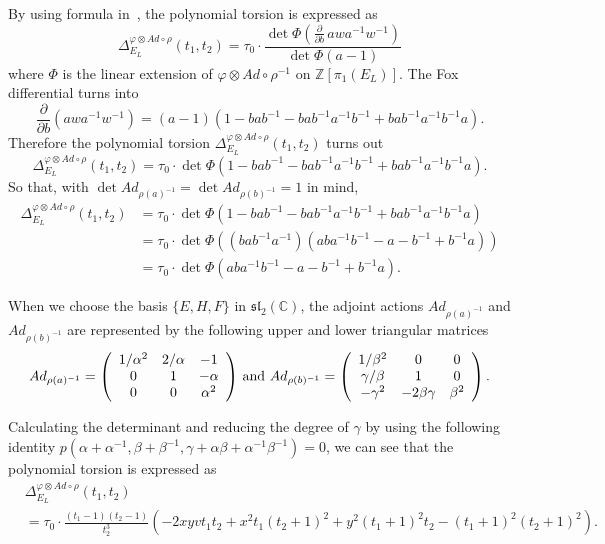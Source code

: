 \documentclass[a4paper]{amsart}
\theoremstyle{plain}
\theoremstyle{definition}
\theoremstyle{remark}
\newcommand{\ZZ}{{\mathbb Z}}
\newcommand{\CC}{{\mathbb C}}
\newcommand{\sll}{\mathfrak{sl}_2(\CC)}
\newcommand{\PolyTors}[2]{\Delta_{#1}^{#2}}
\newcommand{\otAd}[2]{#1 \otimes Ad \circ #2}
\begin{document}
By using formula in~\cite{Milnor:1968,Kitano, KL},
the polynomial torsion is expressed as 
\[
\PolyTors{E_L}{\otAd{\varphi}{\rho}}(t_1, t_2)
= 
\tau_0 \cdot 
\frac{\det \Phi \left( \frac{\partial}{\partial b}\, awa^{-1}w^{-1}  \right)}{\det \Phi(a-1)}
\]
where $\Phi$ is the linear extension of $\otAd{\varphi}{\rho^{-1}}$ on $\ZZ[\pi_1(E_L)]$.
The Fox differential turns into 
\[
\frac{\partial}{\partial b}\left( {awa^{-1}w^{-1} }\right)
= (a-1)(1 - bab^{-1} - bab^{-1}a^{-1}b^{-1} + bab^{-1}a^{-1}b^{-1}a).
\]
Therefore the polynomial torsion $\PolyTors{E_L}{\otAd{\varphi}{\rho}}(t_1, t_2)$
turns out 
$$\PolyTors{E_L}{\otAd{\varphi}{\rho}}(t_1, t_2) 
= \tau_0 \cdot \det \Phi(1 - bab^{-1} - bab^{-1}a^{-1}b^{-1} +
bab^{-1}a^{-1}b^{-1}a).$$ 
So that, with $\det Ad _{\rho (a)^{-1}} =
\det Ad_{\rho(b)^{-1}} = 1$ in mind,
\begin{align*}
  \PolyTors{E_L}{\otAd{\varphi}{\rho}}(t_1, t_2)
  &= \tau_0 \cdot 
     \det \Phi(1 - bab^{-1} - bab^{-1}a^{-1}b^{-1} + bab^{-1}a^{-1}b^{-1}a)\\
  &= \tau_0 \cdot 
     \det \Phi\left( (bab^{-1}a^{-1})(aba^{-1}b^{-1} - a - b^{-1} + b^{-1}a ) \right)\\
  &= \tau_0 \cdot  
     \det \Phi(aba^{-1}b^{-1} - a - b^{-1} + b^{-1}a ).
\end{align*}


When we choose the basis $\{E, H, F\}$ in $\sll$, the adjoint actions
$Ad_{\rho(a)^{-1}}$ and $Ad_{\rho(b)^{-1}}$ are represented by the following 
upper and lower triangular matrices
\[
Ad_{\rho(a)^{-1}}=
\left(
  \begin{array}{ccc}
    1/\alpha^2 & 2/\alpha & -1 \\
    0 & 1 & -\alpha \\
    0 & 0 & \alpha^2
  \end{array}
\right)\, \hbox{and}\,\,
Ad_{\rho(b)^{-1}}=
\left(
  \begin{array}{ccc}
    1/\beta^2 & 0 & 0 \\
    \gamma/\beta & 1 & 0 \\
    -\gamma^2 & -2\beta\gamma & \beta^2
  \end{array}
\right).
\]

Calculating the determinant and reducing the degree of $\gamma$ by
using the following identity $p(\alpha + \alpha^{-1}, \beta + \beta^{-1}, \gamma + \alpha
\beta + \alpha^{-1}\beta^{-1})=0$, we can see that the polynomial
torsion is expressed as
\begin{align}\label{eqn:PolyTorsion_WL}
  &\PolyTors{E_L}{\otAd{\varphi}{\rho}}(t_1, t_2)\\
  &= \tau_0 \cdot 
    \frac{(t_1-1)(t_2-1)}{t_2^3} 
    \left( -2xyv t_1t_2 +
    x^2 t_1(t_2+1)^2 + y^2 (t_1+1)^2 t_2 - (t_1+1)^2 (t_2+1)^2
    \right). \nonumber
\end{align}
\end{document}
